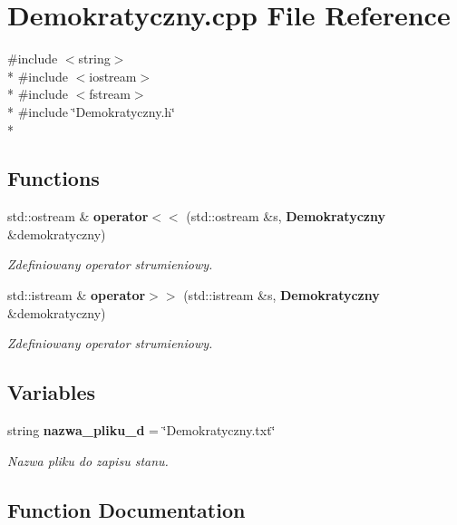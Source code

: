 \section{Demokratyczny.\+cpp File Reference}
\label{_demokratyczny_8cpp}
{\ttfamily \#include $<$string$>$}\\*
{\ttfamily \#include $<$iostream$>$}\\*
{\ttfamily \#include $<$fstream$>$}\\*
{\ttfamily \#include \char`\"{}Demokratyczny.\+h\char`\"{}}\\*
\subsection*{Functions}
\begin{DoxyCompactItemize}
\item 
std\+::ostream \& {\bf operator$<$$<$} (std\+::ostream \&s, {\bf Demokratyczny} \&demokratyczny)
\begin{DoxyCompactList}\small\item\em Zdefiniowany operator strumieniowy. \end{DoxyCompactList}\item 
std\+::istream \& {\bf operator$>$$>$} (std\+::istream \&s, {\bf Demokratyczny} \&demokratyczny)
\begin{DoxyCompactList}\small\item\em Zdefiniowany operator strumieniowy. \end{DoxyCompactList}\end{DoxyCompactItemize}
\subsection*{Variables}
\begin{DoxyCompactItemize}
\item 
string {\bf nazwa\+\_\+pliku\+\_\+d} = \char`\"{}Demokratyczny.\+txt\char`\"{}
\begin{DoxyCompactList}\small\item\em Nazwa pliku do zapisu stanu. \end{DoxyCompactList}\end{DoxyCompactItemize}


\subsection{Function Documentation}
